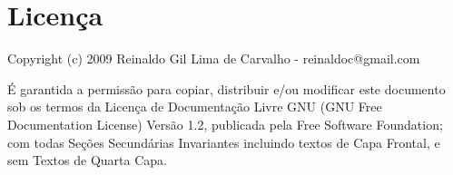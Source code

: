 \newpage \chapter{Licença}\setcounter{SteP}{1}

\begin{BoxVerbatim}
    Copyright (c)  2009   Reinaldo Gil Lima de Carvalho - reinaldoc@gmail.com

    É garantida a permissão para copiar, distribuir e/ou modificar este documento
sob os termos da Licença de Documentação Livre GNU (GNU Free Documentation
License) Versão 1.2, publicada pela Free Software Foundation; com todas Seções
Secundárias Invariantes incluindo textos de Capa Frontal, e sem Textos de Quarta
Capa.
\end{BoxVerbatim}

